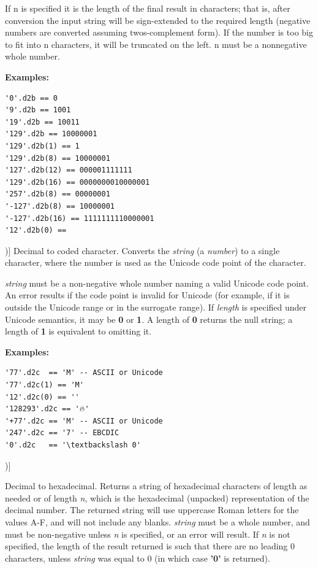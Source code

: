 \begin{description}
If n is specified it is the length of the final result in characters;
that is, after conversion the input string will be sign-extended to
the required length (negative numbers are converted assuming
twos-complement form). If the number is too big to fit into n
characters, it will be truncated on the left. n must be a nonnegative
whole number.

 \textbf{Examples:}
\begin{lstlisting}
'0'.d2b == 0 
'9'.d2b == 1001 
'19'.d2b == 10011 
'129'.d2b == 10000001 
'129'.d2b(1) == 1 
'129'.d2b(8) == 10000001 
'127'.d2b(12) == 000001111111 
'129'.d2b(16) == 0000000010000001 
'257'.d2b(8) == 00000001 
'-127'.d2b(8) == 10000001 
'-127'.d2b(16) == 1111111110000001 
'12'.d2b(0) == 
\end{lstlisting}

\item[d2c([length])]\label{refd2c}
Decimal to coded character.
Converts the \emph{string} (a \crexx{} \emph{number}) to a
single character, where the number is used as the Unicode code point of the
character.
 
\emph{string} must be a non-negative whole number naming a valid Unicode code
point. An error results if the code point is invalid for Unicode (for example,
if it is outside the Unicode range or in the surrogate range).
If \emph{length} is specified under Unicode semantics, it may be \textbf{0} or
\textbf{1}. A length of \textbf{0} returns the null string; a length of
\textbf{1} is equivalent to omitting it.
 
\textbf{Examples:}
\begin{lstlisting}
'77'.d2c  == 'M' -- ASCII or Unicode
'77'.d2c(1) == 'M'
'12'.d2c(0) == ''
'128293'.d2c == '🔥'
'+77'.d2c == 'M' -- ASCII or Unicode
'247'.d2c == '7' -- EBCDIC
'0'.d2c   == '\textbackslash 0'
\end{lstlisting}
\item[d2x([n])]\label{refd2x}

Decimal to hexadecimal.
Returns a string of hexadecimal characters of length as needed or of
length \emph{n}, which is the hexadecimal (unpacked) representation
of the decimal number.  The returned string will use uppercase
Roman letters for the values A-F, and will not include any blanks.
 \emph{string} must be a whole number, and must be non-negative
unless \emph{n} is specified, or an error will result.
If \emph{n} is not specified, the length of the result returned is
such that there are no leading 0 characters, unless \emph{string}
was equal to 0 (in which case \textbf{'0'} is returned).
 

\end{description}
